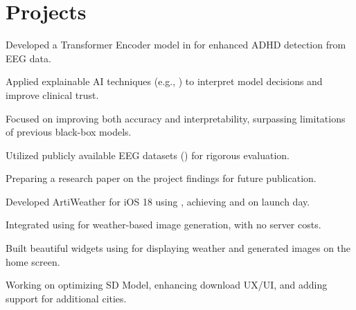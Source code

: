 \documentclass{fonts}
\begin{document}

\section{Projects}

\textbf{\href{[Link to project/repo]}{}}
\begin{tightemize}
    \item Developed a Transformer Encoder model in  for enhanced ADHD detection from EEG data.
    \item Applied explainable AI techniques (e.g., ) to interpret model decisions and improve clinical trust.
    \item Focused on improving both accuracy and interpretability, surpassing limitations of previous black-box models.
    \item Utilized publicly available EEG datasets () for rigorous evaluation.
    \item Preparing a research paper on the project findings for future publication.
\end{tightemize}
\sectionsep


\textbf{\href{https://apps.apple.com/app/artiweather/id6446815662}{}} 
\begin{tightemize}
    \item Developed ArtiWeather for iOS 18 using , achieving  and  on launch day.
    \item Integrated  using  for weather-based image generation, with no server costs.
    \item Built beautiful widgets using  for displaying weather and generated images on the home screen.
    \item Working on optimizing SD Model, enhancing download UX/UI, and adding support for additional cities.
\end{tightemize}
\sectionsep

\end{document}
